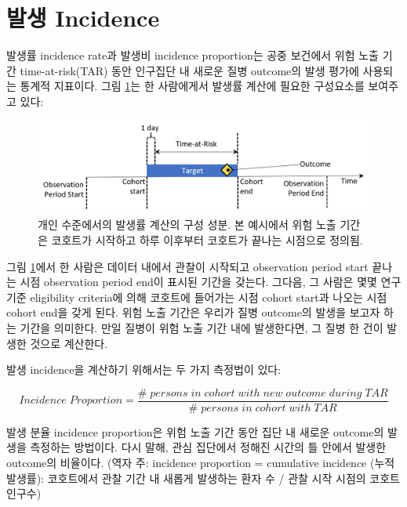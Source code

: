 \documentclass[10.5pt]{book}
\theoremstyle{definition}
\theoremstyle{definition}
\theoremstyle{definition}
\theoremstyle{remark}
\begin{document}
\section{발생 Incidence}\label{-incidence}

발생률 incidence rate과 발생비 incidence proportion는 공중 보건에서 위험
노출 기간 time-at-risk(TAR) 동안 인구집단 내 새로운 질병 outcome의 발생
평가에 사용되는 통계적 지표이다. 그림 \ref{fig:incidenceTimeline}는 한
사람에게서 발생률 계산에 필요한 구성요소를 보여주고 있다:

\begin{figure}

{\centering \includegraphics[width=1\linewidth]{images/Characterization/incidenceTimeline} 

}

\caption{개인 수준에서의 발생률 계산의 구성 성분. 본 예시에서 위험 노출 기간은 코호트가 시작하고 하루 이후부터 코호트가 끝나는 시점으로 정의됨.}\label{fig:incidenceTimeline}
\end{figure}

그림 \ref{fig:incidenceTimeline}에서 한 사람은 데이터 내에서 관찰이
시작되고 observation period start 끝나는 시점 observation period end이
표시된 기간을 갖는다. 그다음, 그 사람은 몇몇 연구 기준 eligibility
criteria에 의해 코호트에 들어가는 시점 cohort start과 나오는 시점 cohort
end을 갖게 된다. 위험 노출 기간은 우리가 질병 outcome의 발생을 보고자
하는 기간을 의미한다. 만일 질병이 위험 노출 기간 내에 발생한다면, 그
질병 한 건이 발생한 것으로 계산한다.

발생 incidence을 계산하기 위해서는 두 가지 측정법이 있다:

\[
Incidence\;Proportion = \frac{\#\;persons\;in\;cohort\;with\;new\;outcome\;during\;TAR}{\#\;persons\;in\;cohort\;with\;TAR}
\]

발생 분율 incidence proportion은 위험 노출 기간 동안 집단 내 새로운
outcome의 발생을 측정하는 방법이다. 다시 말해, 관심 집단에서 정해진
시간의 틀 안에서 발생한 outcome의 비율이다. 
(역자 주: incidence proportion = cumulative incidence (누적 발생률):
코호트에서 관찰 기간 내 새롭게 발생하는 환자 수 / 관찰 시작 시점의
코호트 인구수)
\end{document}
